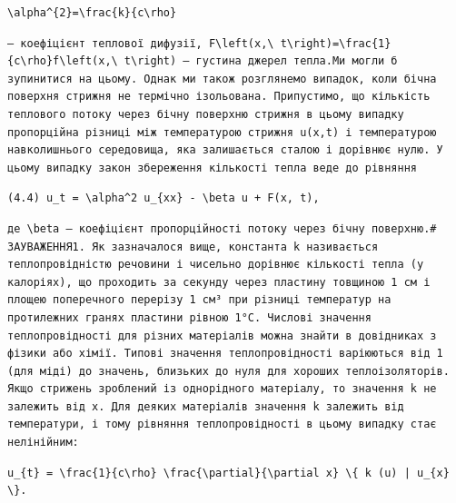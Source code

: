 \documentclass[
  ukrainian,
]{article}
\begin{document}
\begin{verbatim}
\alpha^{2}=\frac{k}{c\rho}
\end{verbatim}

\begin{verbatim}
— коефіцієнт теплової дифузії, F\left(x,\ t\right)=\frac{1}{c\rho}f\left(x,\ t\right) — густина джерел тепла.Ми могли б зупинитися на цьому. Однак ми також розглянемо випадок, коли бічна поверхня стрижня не термічно ізольована. Припустимо, що кількість теплового потоку через бічну поверхню стрижня в цьому випадку пропорційна різниці між температурою стрижня u(x,t) і температурою навколишнього середовища, яка залишається сталою і дорівнює нулю. У цьому випадку закон збереження кількості тепла веде до рівняння
\end{verbatim}

\begin{verbatim}
(4.4) u_t = \alpha^2 u_{xx} - \beta u + F(x, t),
\end{verbatim}

\begin{verbatim}
де \beta — коефіцієнт пропорційності потоку через бічну поверхню.# ЗАУВАЖЕННЯ1. Як зазначалося вище, константа k називається теплопровідністю речовини і чисельно дорівнює кількості тепла (у калоріях), що проходить за секунду через пластину товщиною 1 см і площею поперечного перерізу 1 см³ при різниці температур на протилежних гранях пластини рівною 1°C. Числові значення теплопровідності для різних матеріалів можна знайти в довідниках з фізики або хімії. Типові значення теплопровідності варіюються від 1 (для міді) до значень, близьких до нуля для хороших теплоізоляторів. Якщо стрижень зроблений із однорідного матеріалу, то значення k не залежить від x. Для деяких матеріалів значення k залежить від температури, і тому рівняння теплопровідності в цьому випадку стає нелінійним:
\end{verbatim}

\begin{verbatim}
u_{t} = \frac{1}{c\rho} \frac{\partial}{\partial x} \{ k (u) | u_{x} \}.
\end{verbatim}
\end{document}
